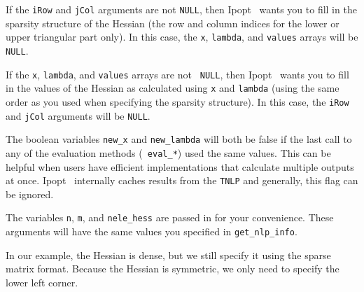 \documentclass[10pt]{article}
\newcommand{\Ipopt}{{\sc Ipopt }}
\begin{document}
If the {\tt iRow} and {\tt jCol} arguments are not {\tt NULL}, then
\Ipopt\ wants you to fill in the sparsity structure of the Hessian
(the row and column indices for the lower or upper triangular part
only). In this case, the {\tt x}, {\tt lambda}, and {\tt values}
arrays will be {\tt NULL}.

If the {\tt x}, {\tt lambda}, and {\tt values} arrays are not {\tt
  NULL}, then \Ipopt\ wants you to fill in the values of the Hessian
as calculated using {\tt x} and {\tt lambda} (using the same order as
you used when specifying the sparsity structure). In this case, the
{\tt iRow} and {\tt jCol} arguments will be {\tt NULL}.

The boolean variables {\tt new\_x} and {\tt new\_lambda} will both be
false if the last call to any of the evaluation methods ({\tt
  eval\_*}) used the same values. This can be helpful when users have
efficient implementations that calculate multiple outputs at once.
\Ipopt\ internally caches results from the {\tt TNLP} and generally,
this flag can be ignored.

The variables {\tt n}, {\tt m}, and {\tt nele\_hess} are passed in for
your convenience. These arguments will have the same values you
specified in {\tt get\_nlp\_info}.

In our example, the Hessian is dense, but we still specify it using the
sparse matrix format. Because the Hessian is symmetric, we only need to 
specify the lower left corner.
\end{document}
